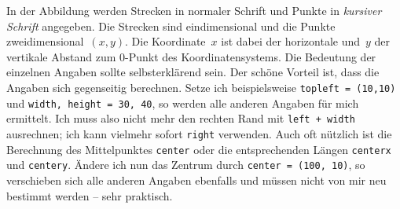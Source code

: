 %
%
%
%
%
%
%
%
%
%
%
%

%
%
%
%
%
%
%
%
%
%
%
%

In der Abbildung werden Strecken in normaler Schrift und Punkte in \textit{kursiver Schrift} angegeben. Die Strecken sind eindimensional und die Punkte zweidimensional~$(x,y)$. Die Koordinate~$x$ ist dabei der horizontale und~$y$ der vertikale Abstand zum 0-Punkt des Koordinatensystems. Die Bedeutung der einzelnen Angaben sollte selbsterklärend sein. Der schöne Vorteil ist, dass die Angaben sich gegenseitig berechnen. Setze ich beispielsweise \texttt{topleft = (10,10)} und \texttt{width, height = 30, 40}, so werden alle anderen Angaben für mich ermittelt. Ich muss also nicht mehr den rechten Rand mit \texttt{left + width} ausrechnen; ich kann vielmehr sofort \texttt{right} verwenden. Auch oft nützlich ist die Berechnung des Mittelpunktes \texttt{center} oder die entsprechenden Längen \texttt{centerx} und \texttt{centery}. Ändere ich nun das Zentrum durch \texttt{center = (100, 10)}, so verschieben sich alle anderen Angaben ebenfalls und müssen nicht von mir neu bestimmt werden -- sehr praktisch.


